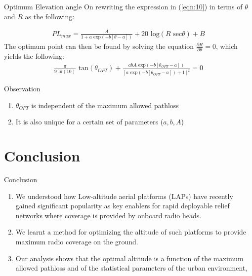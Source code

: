 \documentclass{beamer}
\begin{document}
\begin{frame}{}
\begin{block}{Optimum Elevation angle}
On rewriting the expression in (\ref{eqn:10}) in terms of $\theta$ and $R$ as the following:

\begin{align}
    PL_{max} = \frac{A}{1 + a\text{ exp}(-b[\theta-a])} + 20\text{ log}(R\text{ sec}\theta) + B
\end{align}
The optimum point can then be found by solving the equation
$\frac{\partial R}{\partial \theta} = 0$, which yields the following:
\begin{align}
    \frac{\pi}{9\text{ ln}(10)}\text{ tan}(\theta_{OPT}) + \frac{abA \text{ exp}(-b[\theta_{OPT}-a])}{[a\text{ exp}(-b[\theta_{OPT}-a])+1]^2} = 0
     \label{eqn:13}
\end{align}
\end{block}
\begin{block}{Observation}
\begin{enumerate}
    \item  $\theta_{OPT}$ is independent of the maximum allowed pathloss
    \item It is also unique for a certain set of parameters ($a, b, A$)
\end{enumerate}

\end{block}
   
\end{frame}
\section{Conclusion}
\begin{frame}{Conclusion}
    
    \begin{enumerate}
        

\item We understood how Low-altitude aerial platforms (LAPs) have recently
gained significant popularity as key enablers for rapid deployable
relief networks where coverage is provided by onboard radio
heads.
\item We learnt a method for  optimizing the altitude of such platforms
to provide maximum radio coverage on the ground. 
\item Our analysis shows that the optimal altitude is a function of the maximum allowed pathloss and of the statistical parameters of the urban
environment,
    \end{enumerate}
    
\end{frame}
\end{document}
